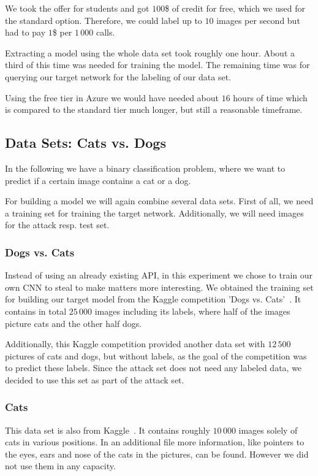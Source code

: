 \documentclass[a4paper,11pt]{article}
\begin{document}
        We took the offer for students and got $100$\$ of credit for free, which we used for the standard option. Therefore, we could label up to $10$ images per second but had to pay $1$\$ per $1\,000$ calls.
        
        Extracting a model using the whole data set took roughly one hour. About a third of this time was needed for training the model. The remaining time was for querying our target network for the labeling of our data set. 
        
        Using the free tier in Azure we would have needed about $16$ hours of time which is compared to the standard tier much longer, but still a reasonable timeframe. 

    \subsection{Data Sets: Cats vs. Dogs}
        In the following we have a binary classification problem, where we want to predict if a certain image contains a cat or a dog. 
        
        For building a model we will again combine several data sets. First of all, we need a training set for training the target network. Additionally, we will need images for the attack resp. test set. 
        
        \subsubsection{Dogs vs. Cats}\label{subsec:dataset_cats-dogs}
            Instead of using an already existing API, in this experiment we chose to train our own CNN to steal to make matters more interesting. We obtained the training set for building our target model from the Kaggle competition 'Dogs vs. Cats'~\cite{dogs-cats}. It contains in total $25\,000$ images including its labels, where half of the images picture cats and the other half dogs.
            
            Additionally, this Kaggle competition provided another data set with $12\,500$ pictures of cats and dogs, but without labels, as the goal of the competition was to predict these labels. Since the attack set does not need any labeled data, we decided to use this set as part of the attack set.
            
        \subsubsection{Cats} \label{subsec:dataset_cats}
            This data set is also from Kaggle~\cite{cats}. It contains roughly $10\,000$ images solely of cats in various positions. 
            In an additional file more information, like pointers to the eyes, ears and nose of the cats in the pictures, can be found. However we did not use them in any capacity. 
            
\end{document}
